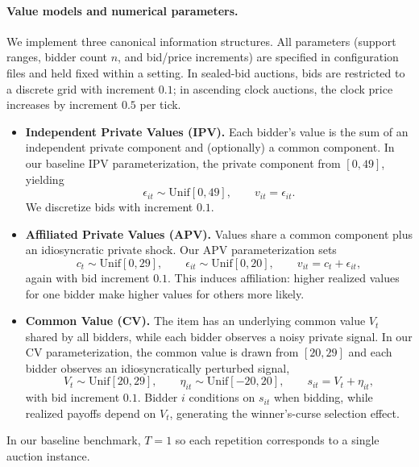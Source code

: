 \documentclass[acmsmall,screen,review]{acmart}
\begin{document}
\paragraph{Value models and numerical parameters.}
We implement three canonical information structures. All parameters (support ranges, bidder count $n$, and bid/price increments) are specified in configuration files and held fixed within a setting. In sealed-bid auctions, bids are restricted to a discrete grid with increment $0.1$; in ascending clock auctions, the clock price increases by increment $0.5$ per tick.

\begin{itemize}
    \item \textbf{Independent Private Values (IPV).} Each bidder's value is the sum of an independent private component and (optionally) a common component. In our baseline IPV parameterization, the private component from $[0,49]$, yielding
    \[
          \epsilon_{it} \sim \mathrm{Unif}[0,49], \qquad v_{it}=\epsilon_{it}.
    \]
    We discretize bids with increment $0.1$.

    \item \textbf{Affiliated Private Values (APV).} Values share a common component plus an idiosyncratic private shock. Our APV parameterization sets
    \[
        c_t \sim \mathrm{Unif}[0,29], \qquad \epsilon_{it} \sim \mathrm{Unif}[0,20], \qquad v_{it}=c_t+\epsilon_{it},
    \]
    again with bid increment $0.1$. This induces affiliation: higher realized values for one bidder make higher values for others more likely.

    \item \textbf{Common Value (CV).} The item has an underlying common value $V_t$ shared by all bidders, while each bidder observes a noisy private signal. In our CV parameterization, the common value is drawn from $[20,29]$ and each bidder observes an idiosyncratically perturbed signal,
    \[
        V_t \sim \mathrm{Unif}[20,29], \qquad \eta_{it} \sim \mathrm{Unif}[-20,20], \qquad s_{it}=V_t+\eta_{it},
    \]
    with bid increment $0.1$. Bidder $i$ conditions on $s_{it}$ when bidding, while realized payoffs depend on $V_t$, generating the winner's-curse selection effect.
\end{itemize}
In our baseline benchmark, $T=1$ so each repetition corresponds to a single auction instance.
\end{document}
